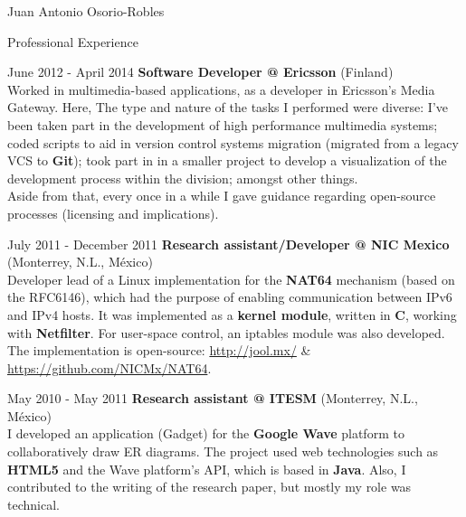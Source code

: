 \documentclass[english,10pt,letterpaper]{article}
\begin{document}
\begin{cv}{Juan Antonio Osorio-Robles}
\begin{cvlist}{Professional Experience}
		\item [June 2012 - April 2014]
            \textbf{Software Developer @ Ericsson} (Finland)\\
            Worked in multimedia-based applications, as a developer in
            Ericsson's Media Gateway. Here, The type and nature of the
            tasks I performed were diverse: I've been taken part in the
            development of high performance multimedia systems; coded
            scripts to aid in version control systems migration (migrated
            from a legacy VCS to \textbf{Git}); took part in in a smaller
            project to develop a visualization of the development process
            within the division; amongst other things.\\

            Aside from that, every once in a while I gave guidance
            regarding open-source processes (licensing and implications).

		\item [July 2011 - December 2011]
            \textbf{Research assistant/Developer @ NIC Mexico} (Monterrey,
            N.L., M\'{e}xico)\\
            Developer lead of a Linux implementation for the \textbf{NAT64}
            mechanism (based on the RFC6146), which had the purpose of
            enabling communication between IPv6 and IPv4 hosts. It was
            implemented as a \textbf{kernel module}, written in \textbf{C},
            working with \textbf{Netfilter}. For user-space control, an
            iptables module was also developed. The implementation is
            open-source:
            \href{http://jool.mx/}{http://jool.mx/} \&\\
            \href{https://github.com/NICMx/NAT64}{https://github.com/NICMx/NAT64}.

		\item [May 2010 - May 2011]
            \textbf{Research assistant @ ITESM} (Monterrey, N.L., M\'{e}xico)\\
            I developed an application (Gadget) for the \textbf{Google Wave}
            platform to collaboratively draw ER diagrams. The project used web
            technologies such as \textbf{HTML5} and the Wave platform's API,
            which is based in \textbf{Java}. Also, I contributed to the
            writing of the research paper, but mostly my role was technical.

	\end{cvlist}


\end{cv}
\end{document}
